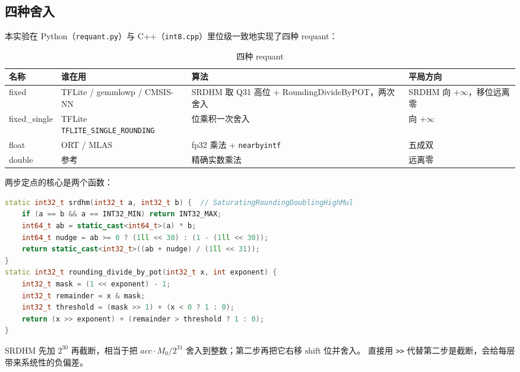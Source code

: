 \documentclass[11pt,a4paper]{ctexart}
\begin{document}
\subsection{四种舍入}

本实验在 Python（\texttt{requant.py}）与 C++（\texttt{int8.cpp}）里位级一致地实现了四种 requant：

\begin{table}[H]
\centering\small
\caption{四种 requant}\label{tab:styles}
\begin{tabularx}{\linewidth}{>{\raggedright\arraybackslash}p{2.1cm} >{\raggedright\arraybackslash}p{3.4cm} >{\raggedright\arraybackslash}X >{\raggedright\arraybackslash}p{2.9cm}}
\toprule
名称 & 谁在用 & 算法 & 平局方向 \\
\midrule
fixed & TFLite / gemmlowp / CMSIS-NN & SRDHM 取 Q31 高位 + RoundingDivideByPOT，两次舍入 & SRDHM 向 $+\infty$，移位远离零 \\
fixed\_single & TFLite \texttt{TFLITE\_\allowbreak SINGLE\_\allowbreak ROUNDING} & 64 位乘积一次舍入 & 向 $+\infty$ \\
float & ORT / MLAS & fp32 乘法 + \texttt{nearbyintf} & 五成双 \\
double & 参考 & 精确实数乘法 & 远离零 \\
\bottomrule
\end{tabularx}
\end{table}

两步定点的核心是两个函数：

\begin{lstlisting}[language=C++]
static int32_t srdhm(int32_t a, int32_t b) {  // SaturatingRoundingDoublingHighMul
    if (a == b && a == INT32_MIN) return INT32_MAX;
    int64_t ab = static_cast<int64_t>(a) * b;
    int64_t nudge = ab >= 0 ? (1ll << 30) : (1 - (1ll << 30));
    return static_cast<int32_t>((ab + nudge) / (1ll << 31));
}
static int32_t rounding_divide_by_pot(int32_t x, int exponent) {
    int32_t mask = (1 << exponent) - 1;
    int32_t remainder = x & mask;
    int32_t threshold = (mask >> 1) + (x < 0 ? 1 : 0);
    return (x >> exponent) + (remainder > threshold ? 1 : 0);
}
\end{lstlisting}

SRDHM 先加 $2^{30}$ 再截断，相当于把 $acc\cdot M_0/2^{31}$ 舍入到整数；第二步再把它右移 $\mathrm{shift}$ 位并舍入。
直接用 \texttt{>>} 代替第二步是截断，会给每层带来系统性的负偏差。
\end{document}
